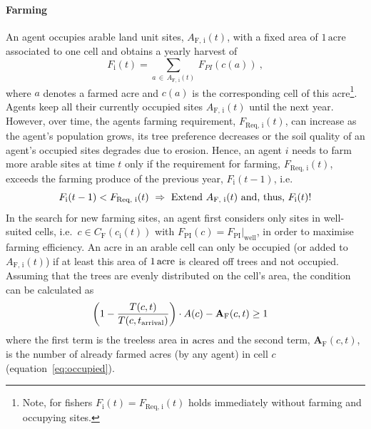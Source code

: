 \paragraph{Farming}
An agent occupies arable land unit sites, $A_\text{F, i}(t)$, with a fixed area of $1\, \text{acre}$ associated to one cell and obtains a yearly harvest of
\begin{equation}\label{AProd}
F_\text{i}(t) = \sum_{a \, \in \, A_\text{F, i}(t)} \, F_{PI}(c(a))\ ,
\end{equation}
where $a$ denotes a farmed acre and $c(a)$ is the corresponding cell of this acre\footnote{Note, for fishers $F_\text{i}(t) = F_\text{Req, i}(t)$ holds immediately without farming and occupying sites.}.
Agents keep all their currently occupied sites $A_\text{F, i}(t)$ until the next year.%
However, over time, the agents farming requirement, $F_\text{Req, i}(t)$, can increase as the agent's population grows, its tree preference decreases or the soil quality of an agent's occupied sites degrades due to erosion.
Hence, an agent $i$ needs to farm more arable sites at time $t$ only if the requirement for farming, $F_\text{Req, i}(t)$, exceeds the farming produce of the previous year, $F_\text{i}(t-1)$, i.e.\
\begin{equation}
F_\text{i}(t-1) < F_\text{Req, i}(t) \ \Rightarrow \ \text{Extend } A_\text{F, i}(t) \text{ and, thus, } F_\text{i}(t) {\rm !}
\end{equation}
In the search for new farming sites, an agent first considers only sites in well-suited cells, i.e.\ $c \in C_\text{F}(c_\text{i}(t))$ with $F_\text{PI}(c)=F_\text{PI}|_\text{well}$, in order to maximise farming efficiency.
An acre in an arable cell can only be occupied (or added to $A_\text{F, i}(t)$) if at least this area of $1\, {\rm acre}$ is cleared off trees and not occupied. 
Assuming that the trees are evenly distributed on the cell's area, the condition can be calculated as 
\begin{eqnarray}
\left( 1 - \frac{T(c,t)}{T(c,t_{\rm arrival})} \right) \cdot A(c) - \mathbf{A}_\text{F}(c, t) & \geq   1
\label{eq:BurningCond}
\end{eqnarray}
where the first term is the treeless area in ${\rm acres}$ and the second term, $\mathbf{A}_\text{F}(c, t)$, is the number of already farmed acres (by any agent) in cell $c$ (equation~\ref{eq:occupied}).

